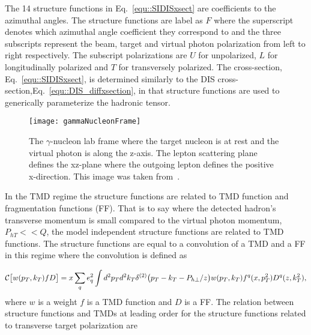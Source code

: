 The 14 structure functions in Eq.~\ref{equ::SIDISxsect} are coefficients to the
azimuthal angles.  The structure functions are label as $F$ where the
superscript denotes which azimuthal angle coefficient they correspond to and the
three subscripts represent the beam, target and virtual photon polarization from
left to right respectively.  The subscript polarizations are $U$ for
unpolarized, $L$ for longitudinally polarized and $T$ for transversely
polarized.  The cross-section, Eq.~\ref{equ::SIDISxsect}, is determined
similarly to the DIS cross-section,Eq.~\ref{equ::DIS_diffxsection}, in that
structure functions are used to generically parameterize the hadronic tensor.

\begin{figure}[h!t]
  \centering \texttt{[image: gammaNucleonFrame]}
  \caption{The $\gamma$-nucleon lab frame where the target nucleon is at rest
    and the virtual photon is along the z-axis.  The lepton scattering plane
    defines the xz-plane where the outgoing lepton defines the positive
    x-direction.  This image was taken from~\cite{Bacchetta:2006tn}.}
  \label{fig::gammaNucleonFrame}
\end{figure}

In the TMD regime the structure functions are related to TMD function and
fragmentation functions (FF).  That is to say where the detected hadron's
transverse momentum is small compared to the virtual photon momentum, $P_{hT} <<
Q$, the model independent structure functions are related to TMD functions.  The
structure functions are equal to a convolution of a TMD and a FF in this regime
where the convolution is defined as

\begin{equation}
  \label{equ::SIDIS_conv}
{\cal C}\bigl[ w(p_T,k_T) f D \bigr] = x \sum_q e_q^2 \int d^2 p_T d^2 k_T
\delta^{(2)}\bigl(p_T - k_T - P_{h \perp}/z \bigr) w(p_T,k_T)
f^q(x,p_T^2)D^q(z,k_T^2),
\end{equation}
\noindent
where $w$ is a weight $f$ is a TMD function and $D$ is a FF.  The relation
between structure functions and TMDs at leading order for the structure
functions related to transverse target polarization are~\cite{Bacchetta:2006tn}


